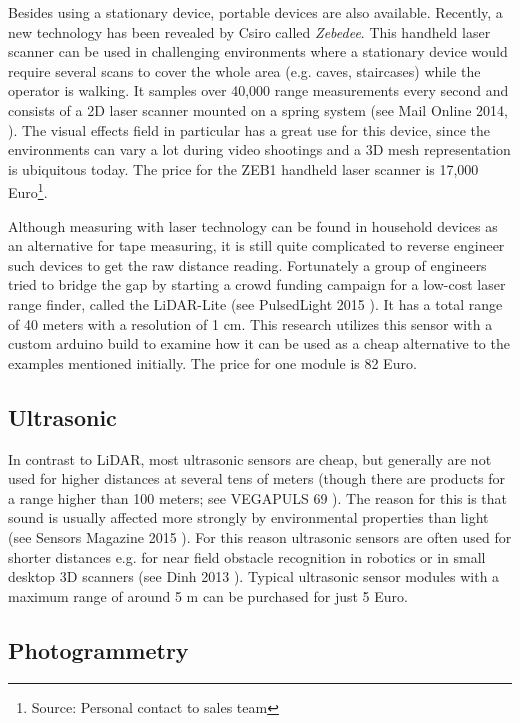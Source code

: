 Besides using a stationary device, portable devices are also available. Recently, a new technology has been revealed by Csiro called \textit{Zebedee}. This handheld laser scanner can be used in challenging environments where a stationary device would require several scans to cover the whole area (e.g. caves, staircases) while the operator is walking. It samples over 40,000 range measurements every second and consists of a 2D laser scanner mounted on a spring system (see Mail Online 2014, \parencite{zebedee_info}). The visual effects field in particular has a great use for this device, since the environments can vary a lot during video shootings and a 3D mesh representation is ubiquitous today. The price for the ZEB1 handheld laser scanner is 17,000 Euro\footnote{Source: Personal contact to sales team}.

Although measuring with laser technology can be found in household devices as an alternative for tape measuring, it is still quite complicated to reverse engineer such devices to get the raw distance reading. Fortunately a group of engineers tried to bridge the gap by starting a crowd funding campaign for a low-cost laser range finder, called the LiDAR-Lite (see PulsedLight 2015 \parencite{pulsedlight}). It has a total range of 40 meters with a resolution of 1 cm. This research utilizes this sensor with a custom arduino build to examine how it can be used as a cheap alternative to the examples mentioned initially. The price for one module is 82 Euro.

\subsection{Ultrasonic}

In contrast to LiDAR, most ultrasonic sensors are cheap, but generally are not used for higher distances at several tens of meters (though there are products for a range higher than 100 meters; see VEGAPULS 69 \parencite{vegapuls}). The reason for this is that sound is usually affected more strongly by environmental properties than light (see Sensors Magazine 2015 \parencite{sensorsmag}). For this reason ultrasonic sensors are often used for shorter distances e.g. for near field obstacle recognition in robotics or in small desktop 3D scanners (see Dinh 2013 \parencite{yt_smalldesktoplaser}). Typical ultrasonic sensor modules with a maximum range of around 5 m can be purchased for just 5 Euro.

\subsection{Photogrammetry}

